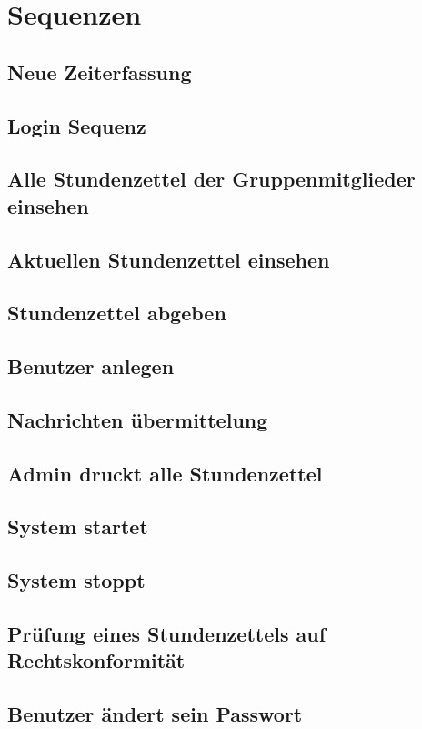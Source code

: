 \section{Sequenzen}
    \subsection{Neue Zeiterfassung}
    \subsection{Login Sequenz}
    \subsection{Alle Stundenzettel der Gruppenmitglieder einsehen}
    \subsection{Aktuellen Stundenzettel einsehen}
    \subsection{Stundenzettel abgeben}
    \subsection{Benutzer anlegen}
    \subsection{Nachrichten übermittelung}
    \subsection{Admin druckt alle Stundenzettel}
    \subsection{System startet}
    \subsection{System stoppt}
    \subsection{Prüfung eines Stundenzettels auf Rechtskonformität}
    \subsection{Benutzer ändert sein Passwort}

\newpage
